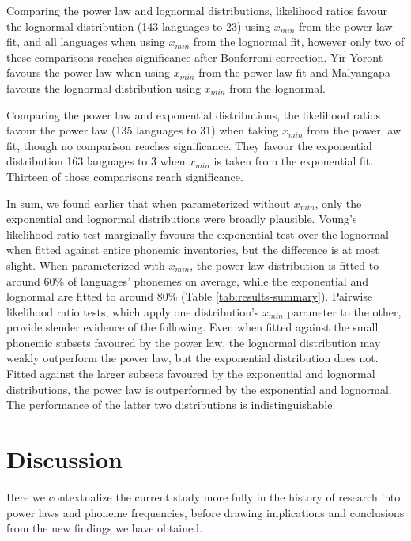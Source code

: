 Comparing the power law and lognormal distributions, likelihood ratios favour the lognormal distribution (143 languages to 23) using \(x_{min}\) from the power law fit, and all languages when using \(x_{min}\) from the lognormal fit, however only two of these comparisons reaches significance after Bonferroni correction. Yir Yoront favours the power law when using \(x_{min}\) from the power law fit and Malyangapa favours the lognormal distribution using \(x_{min}\) from the lognormal.

Comparing the power law and exponential distributions, the likelihood ratios favour the power law (135 languages to 31) when taking \(x_{min}\) from the power law fit, though no comparison reaches significance. They favour the exponential distribution 163 languages to 3 when \(x_{min}\) is taken from the exponential fit. Thirteen of those comparisons reach significance.

In sum, we found earlier that when parameterized without \(x_{min}\), only the exponential and lognormal distributions were broadly plausible. Voung's likelihood ratio test marginally favours the exponential test over the lognormal when fitted against entire phonemic inventories, but the difference is at most slight. When parameterized with \(x_{min}\), the power law distribution is fitted to around 60\% of languages' phonemes on average, while the exponential and lognormal are fitted to around 80\% (Table \ref{tab:results-summary}). Pairwise likelihood ratio tests, which apply one distribution's \(x_{min}\) parameter to the other, provide slender evidence of the following. Even when fitted against the small phonemic subsets favoured by the power law, the lognormal distribution may weakly outperform the power law, but the exponential distribution does not. Fitted against the larger subsets favoured by the exponential and lognormal distributions, the power law is outperformed by the exponential and lognormal. The performance of the latter two distributions is indistinguishable.

\hypertarget{discussion}{%
\section*{Discussion}\label{discussion}}

Here we contextualize the current study more fully in the history of research into power laws and phoneme frequencies, before drawing implications and conclusions from the new findings we have obtained. \newline

